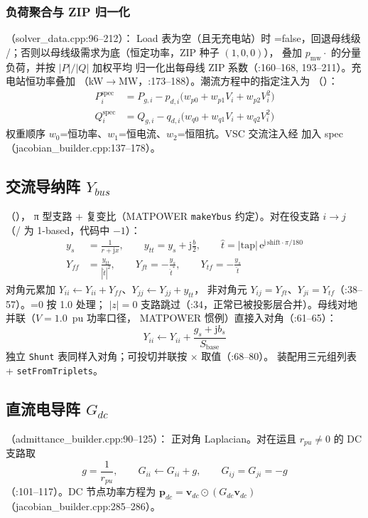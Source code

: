 \subsubsection*{负荷聚合与 ZIP 归一化}
（solver\_data.cpp:96--212）：
Load 表为空（且无充电站）时 =false，回退母线级
/；否则以母线级需求为底（恒定功率，ZIP 种子 $(1,0,0)$），
叠加 $p_{\mathrm{mw}}\cdot$ 的分量负荷，并按 $|P|/|Q|$ 加权平均
归一化出每母线 ZIP 系数（:160--168, 193--211）。充电站恒功率叠加
（kW$\to$MW，:173--188）。潮流方程中的指定注入为
（）：
\begin{align*}
P_i^{\mathrm{spec}} &= P_{g,i}-p_{d,i}\big(w_{p0}+w_{p1}V_i+w_{p2}V_i^2\big)\\
Q_i^{\mathrm{spec}} &= Q_{g,i}-q_{d,i}\big(w_{q0}+w_{q1}V_i+w_{q2}V_i^2\big)
\end{align*}
权重顺序 $w_0$=恒功率、$w_1$=恒电流、$w_2$=恒阻抗。VSC 交流注入经
 加入 spec（jacobian\_builder.cpp:137--178）。

\subsection{交流导纳阵 $Y_{bus}$}
（），
π 型支路 + 复变比（MATPOWER \texttt{makeYbus} 约定）。对在役支路 $i\to j$
（/ 为 1-based，代码中 $-1$）：
\begin{align*}
y_s &= \frac{1}{r+\mathrm{j}x},\qquad
y_{tt} = y_s+\mathrm{j}\frac{b}{2},\qquad
\hat{t} = |\mathrm{tap}|\,\mathrm{e}^{\mathrm{j}\,\mathrm{shift}\cdot\pi/180}\\
Y_{ff} &= \frac{y_{tt}}{|\hat{t}|^2},\qquad
Y_{ft} = -\frac{y_s}{\hat{t}^{*}},\qquad
Y_{tf} = -\frac{y_s}{\hat{t}}
\end{align*}
对角元累加 $Y_{ii}\leftarrow Y_{ii}+Y_{ff}$、$Y_{jj}\leftarrow Y_{jj}+y_{tt}$，
非对角元 $Y_{ij}=Y_{ft}$、$Y_{ji}=Y_{tf}$（:38--57）。=0 按 1.0 处理；
$|z|=0$ 支路跳过（:34，正常已被投影层合并）。母线对地并联（$V=1.0$~pu 功率口径，
MATPOWER 惯例）直接入对角（:61--65）：
\[
Y_{ii}\leftarrow Y_{ii}+\frac{g_s+\mathrm{j}b_s}{S_{\mathrm{base}}}
\]
独立 \texttt{Shunt} 表同样入对角；可投切并联按
$\times$ 取值（:68--80）。
装配用三元组列表 + \texttt{setFromTriplets}。

\subsection{直流电导阵 $G_{dc}$}
（admittance\_builder.cpp:90--125）：
正对角 Laplacian。对在运且 $r_{pu}\neq 0$ 的 DC 支路取
\[
g=\frac{1}{r_{pu}},\qquad G_{ii}\leftarrow G_{ii}+g,\qquad G_{ij}=G_{ji}=-g
\]
（:101--117）。DC 节点功率方程为 $\mathbf p_{dc}=\mathbf v_{dc}\odot(G_{dc}\mathbf v_{dc})$
（jacobian\_builder.cpp:285--286）。

